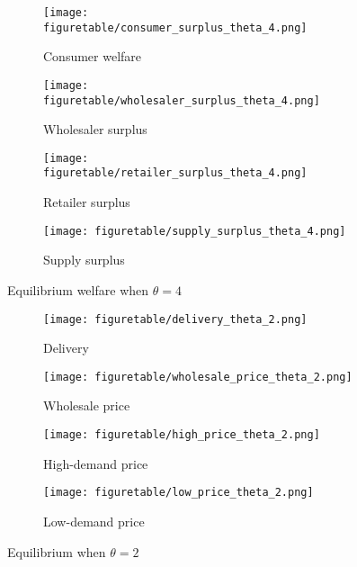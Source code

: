 \documentclass[12pt]{article}
\begin{document}
\begin{figure}[tbp]
	\begin{subfigure}{0.5\textwidth}
		\centering
		\texttt{[image: figuretable/consumer\_surplus\_theta\_4.png]}  
		\caption{Consumer welfare}
		\label{fig:equilibrium_comparison_theta_4_cs}
	\end{subfigure}
	\begin{subfigure}{0.5\textwidth}
		\centering
		\texttt{[image: figuretable/wholesaler\_surplus\_theta\_4.png]} 
		\caption{Wholesaler surplus}
		\label{fig:equilibrium_comparison_theta_4_ws}
	\end{subfigure}
	\newline
	\begin{subfigure}{0.5\textwidth}
		\centering
		\texttt{[image: figuretable/retailer\_surplus\_theta\_4.png]} 
		\caption{Retailer surplus}
		\label{fig:equilibrium_comparison_theta_4_rs}
	\end{subfigure}
	\begin{subfigure}{0.5\textwidth}
		\centering
		\texttt{[image: figuretable/supply\_surplus\_theta\_4.png]} 
		\caption{Supply surplus}
		\label{fig:equilibrium_comparison_theta_4_ss}
	\end{subfigure}
	\caption{Equilibrium welfare when $\theta = 4$}
	\label{fig:welfare_comparision_theta_4}
	\footnotesize
\end{figure}



 \begin{figure}[tbp]
	\begin{subfigure}{.5\textwidth}
		\centering
		\texttt{[image: figuretable/delivery\_theta\_2.png]}  
		\caption{Delivery}
		\label{fig:equilibrium_comparison_theta_2_delivery}
	\end{subfigure}
	\begin{subfigure}{.5\textwidth}
		\centering
		\texttt{[image: figuretable/wholesale\_price\_theta\_2.png]} 
		\caption{Wholesale price}
		\label{fig:equilibrium_comparison_theta_2_wholesale}
	\end{subfigure}
	\newline
	\begin{subfigure}{.5\textwidth}
		\centering
		\texttt{[image: figuretable/high\_price\_theta\_2.png]} 
		\caption{High-demand price}
		\label{fig:equilibrium_comparison_theta_2_high_price}
	\end{subfigure}
	\begin{subfigure}{.5\textwidth}
		\centering
		\texttt{[image: figuretable/low\_price\_theta\_2.png]} 
		\caption{Low-demand price}
		\label{fig:equilibrium_comparison_theta_2_low_price}
	\end{subfigure}
	\caption{Equilibrium when $\theta = 2$}
	\label{fig:equilibrium_comparison_theta_2}
	\footnotesize
\end{figure}
\end{document}
